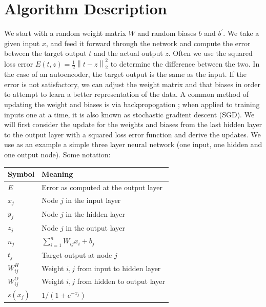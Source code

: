 \documentclass[conference]{IEEEtran}
\newcommand{\norm}[1]{\left\lVert #1 \right\rVert}
\begin{document}
\section{Algorithm Description}
We start with a random weight matrix $W$ and random biases $b$ and $b^{'}$. We take a given input $x$, and feed it forward through the network and 
compute the error between the target output $t$ and the actual output $z$. Often we use the squared loss error $E(t,z) = \frac{1}{2}\norm{t-z}_2^2$ to determine the difference between the two. In the case of an autoencoder, the target output is the same as the input. If the error is not satisfactory, we can adjust the weight matrix and that biases in order to attempt to learn a better representation of the data. A common method of updating the weight and biases is via backpropogation \cite{hecht1989theory}; when applied to training inputs one at a time, it is also known as stochastic gradient descent (SGD). We will first consider the update for the weights and biases from the last hidden layer to the output layer with a squared loss error function and derive the updates. We use as an example a simple three layer neural network (one input, one hidden and one output node). Some notation:

\begin{table}[h]
\normalsize
\begin{tabular}{l|l}
Symbol     & Meaning                                                          \\ \hline
$E$          & Error as computed at the output layer                            \\
$x_j$       & Node $j$ in the input layer                                      \\
$y_j$       & Node $j$ in the hidden layer                                     \\
$z_j$       & Node $j$ in the output layer                                     \\
$n_j$       & $\sum_{i=1}^n W_{ij}x_i + b_j$                                   \\
$t_j$       & Target output at node $j$                                   \\
$W_{ij}^H$ & Weight $i,j$ from input to hidden layer \\
$W_{ij}^O$ & Weight $i,j$ from hidden to output layer \\
$s(x_j)$    & $1/(1+e^{-x_j})$                                                 
\end{tabular}
\end{table}
\end{document}
